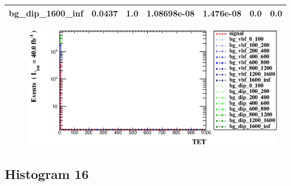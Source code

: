 \documentclass[a4paper, 10pt]{article}
\begin{document}
\begin{table}[H]
\begin{center}
\begin{tabular}{|m{23.0mm}|m{23.0mm}|m{18.0mm}|m{19.0mm}|m{19.0mm}|m{19.0mm}|m{19.0mm}|}
      \hline
      {\cellcolor{white}         bg\_dip\_1600\_inf}& {\cellcolor{white}         0.0437}& {\cellcolor{white}         1.0}& {\cellcolor{white}         1.08698e-08}& {\cellcolor{white}         1.476e-08}& {\cellcolor{green}         0.0}& {\cellcolor{green}         0.0}\\
\hline
    \end{tabular}
  \end{center}
\end{table}

\begin{figure}[H]
  \begin{center}
    \includegraphics[scale=0.45]{selection_14.eps}\\
\caption{   }
  \end{center}
\end{figure}
      \newpage
\subsection{ Histogram 16}
\end{document}
